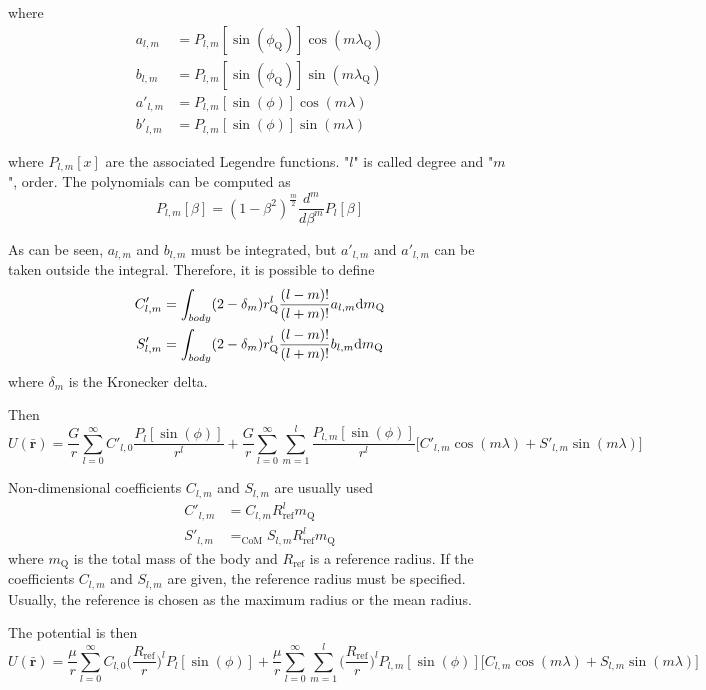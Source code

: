 where
\begin{align}
	a_{l,m} &= P_{l,m}[\sin(\phi_\text{Q})] \cos(m \lambda_\text{Q})\\
	b_{l,m} &= P_{l,m}[\sin(\phi_\text{Q})] \sin(m \lambda_\text{Q})\\
	a'_{l,m} &= P_{l,m}[\sin(\phi)] \cos(m \lambda)\\
	b'_{l,m} &= P_{l,m}[\sin(\phi)] \sin(m \lambda)
\end{align}

where $P_{l,m}[x]$ are the associated Legendre functions. "$l$" is called degree and "$m$", order. The polynomials can be computed as
\begin{equation}
P_{l,m}[\beta] = (1 - \beta^2)^\frac{m}{2} \frac{d^m}{d \beta^m} P_l[\beta]\label{eq:legendre}
\end{equation}

As can be seen, $a_{l,m}$ and $b_{l,m}$ must be integrated, but $a'_{l,m}$ and $a'_{l,m}$ can be taken outside the integral.
Therefore, it is possible to define
\begin{align}
	C'_{l,m} &= \int_{body} (2 -\delta_m) r_\text{Q}^l \frac{(l-m)!}{(l+m)!} a_{l,m} \textrm{d} m_\text{Q}\\
	S'_{l,m} &= \int_{body} (2 -\delta_m) r_\text{Q}^l \frac{(l-m)!}{(l+m)!} b_{l,m} \textrm{d} m_\text{Q}
\end{align}
where $\delta_m$ is the Kronecker delta.

Then
\begin{equation}
U(\mathbf{\bar r}) = \frac{G}{r} \sum_{l=0}^\infty C'_{l,0} \frac{P_l[\sin(\phi)]}{r^l} + \frac{G}{r} \sum_{l=0}^\infty \sum_{m=1}^l \frac{P_{l,m}[\sin(\phi)]}{r^l} \big[C'_{l,m} \cos(m \lambda) + S'_{l,m} \sin(m \lambda)]
\end{equation}

Non-dimensional coefficients $C_{l,m}$ and $S_{l,m}$ are usually used
\begin{align}
	C'_{l,m} &= C_{l,m} R_{\text{ref}}^l m_\text{Q}\\
	S'_{l,m} &= _\text{CoM}S_{l,m} R_{\text{ref}}^l m_\text{Q}
\end{align}
where $m_\text{Q}$ is the total mass of the body and $R_{\text{ref}}$ is a reference radius. If the coefficients $C_{l,m}$ and $S_{l,m}$ are given, the reference radius must be specified. Usually, the reference is chosen as the maximum radius or the mean radius\cite{scheeres2012}.

The potential is then
\begin{equation}
U(\mathbf{\bar r}) = \frac{\mu}{r} \sum_{l=0}^\infty C_{l,0} \bigg(\frac{R_{\text{ref}}}{r}\bigg)^l P_l[\sin(\phi)] + \frac{\mu}{r} \sum_{l=0}^\infty \sum_{m=1}^l \bigg(\frac{R_{\text{ref}}}{r}\bigg)^l P_{l,m}[\sin(\phi)] \big[C_{l,m} \cos(m \lambda) + S_{l,m} \sin(m \lambda)\big]
\end{equation}

